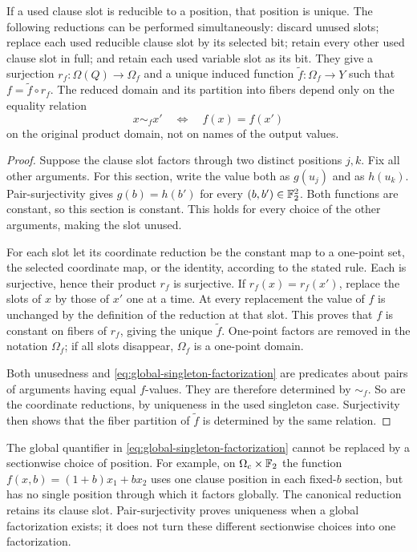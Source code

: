 \begin{lemma}\label{lem:canonical-support}
If a used clause slot is reducible to a position, that position is unique.
The following reductions can be performed simultaneously: discard unused
slots; replace each used reducible clause slot by its selected bit; retain
every other used clause slot in full; and retain each used variable slot
as its bit.  They give a surjection
$r_f:\Omega(Q)\to\Omega_f$ and a unique induced function
$\widetilde f:\Omega_f\to Y$ such that $f=\widetilde f\circ r_f$.
The reduced domain and its partition into fibers depend only on the
equality relation
\[
 x\sim_f x'\quad\Longleftrightarrow\quad f(x)=f(x')
\]
on the original product domain, not on names of the output values.
\end{lemma}
\begin{proof}
Suppose the clause slot factors through two distinct positions $j,k$.
Fix all other arguments.  For this section, write the value both as
$g(u_j)$ and as $h(u_k)$.  Pair-surjectivity gives
$g(b)=h(b')$ for every $(b,b')\in\mathbb F_2^2$.  Both functions are constant,
so this section is constant.  This holds for every choice of the other
arguments, making the slot unused.

For each slot let its coordinate reduction be the constant map to a
one-point set, the selected coordinate map, or the identity, according
to the stated rule.  Each is surjective, hence their product $r_f$ is
surjective.  If $r_f(x)=r_f(x')$, replace the slots of $x$ by those of $x'$
one at a time.  At every replacement the value of $f$ is unchanged by
the definition of the reduction at that slot.  This proves that $f$ is
constant on fibers of $r_f$, giving the unique $\widetilde f$.
One-point factors are removed in the notation $\Omega_f$; if all slots
disappear, $\Omega_f$ is a one-point domain.

Both unusedness and \eqref{eq:global-singleton-factorization} are predicates
about pairs of arguments having equal $f$-values.  They are therefore
determined by $\sim_f$.  So are the coordinate reductions, by uniqueness
in the used singleton case.  Surjectivity then shows that the fiber
partition of $\widetilde f$ is determined by the same relation.
\end{proof}

The global quantifier in \eqref{eq:global-singleton-factorization} cannot
be replaced by a sectionwise choice of position.  For example, on
$\Omega_c\times\mathbb F_2$ the function
$f(x,b)=(1+b)x_1+bx_2$ uses one clause position in each fixed-$b$ section,
but has no single position through which it factors globally.  The
canonical reduction retains its clause slot.  Pair-surjectivity proves
uniqueness when a global factorization exists; it does not turn these
different sectionwise choices into one factorization.

